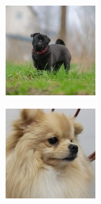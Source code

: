 \documentclass{report}
\begin{document}
\begin{figure}[h!]
\begin{subfigure}[t]{0.19\textwidth}
    \label{fig:dataset-sub2}
  \end{subfigure}
  \hfill
  \begin{subfigure}[t]{0.19\textwidth}
    \centering
    \includegraphics[width=\textwidth]{dataset/dog_2.jpg}
    \label{fig:dataset-sub3}
  \end{subfigure}
  \hfill
  \begin{subfigure}[t]{0.19\textwidth}
    \centering
    \includegraphics[width=\textwidth]{dataset/dog_3.jpg}

\end{subfigure}
\end{figure}
\end{document}
